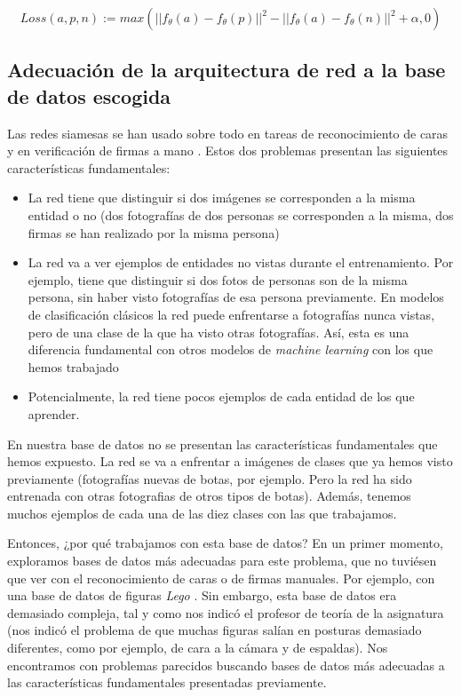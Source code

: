 \documentclass[11pt]{article}
\begin{document}
$$Loss(a, p, n) := max(||f_{\theta}(a) - f_{\theta}(p)||^2 - ||f_{\theta}(a) - f_{\theta}(n)||^2 + \alpha, 0)$$

\pagebreak
\subsection{Adecuación de la arquitectura de red a la base de datos escogida} \label{adecuacion_arquitectura_red:seccion}

Las redes siamesas se han usado sobre todo en tareas de reconocimiento de caras y en verificación de firmas a mano \cite{siamese_wikipedia:online}. Estos dos problemas presentan las siguientes características fundamentales:

\begin{itemize}
  \item La red tiene que distinguir si dos imágenes se corresponden a la misma entidad o no (dos fotografías de dos personas se corresponden a la misma, dos firmas se han realizado por la misma persona)
  \item La red va a ver ejemplos de entidades no vistas durante el entrenamiento. Por ejemplo, tiene que distinguir si dos fotos de personas son de la misma persona, sin haber visto fotografías de esa persona previamente. En modelos de clasificación clásicos la red puede enfrentarse a fotografías nunca vistas, pero de una clase de la que ha visto otras fotografías. Así, esta es una diferencia fundamental con otros modelos de \emph{machine learning} con los que hemos trabajado
  \item Potencialmente, la red tiene pocos ejemplos de cada entidad de los que aprender.
\end{itemize}

En nuestra base de datos no se presentan las características fundamentales que hemos expuesto. La red se va a enfrentar a imágenes de clases que ya hemos visto previamente (fotografías nuevas de botas, por ejemplo. Pero la red ha sido entrenada con otras fotografias de otros tipos de botas). Además, tenemos muchos ejemplos de cada una de las diez clases con las que trabajamos.

Entonces, ¿por qué trabajamos con esta base de datos? En un primer momento, exploramos bases de datos más adecuadas para este problema, que no tuviésen que ver con el reconocimiento de caras o de firmas manuales. Por ejemplo, con una base de datos de figuras \emph{Lego} \cite{lego_database:online}. Sin embargo, esta base de datos era demasiado compleja, tal y como nos indicó el profesor de teoría de la asignatura (nos indicó el problema de que muchas figuras salían en posturas demasiado diferentes, como por ejemplo, de cara a la cámara y de espaldas). Nos encontramos con problemas parecidos buscando bases de datos más adecuadas a las características fundamentales presentadas previamente.
\end{document}
